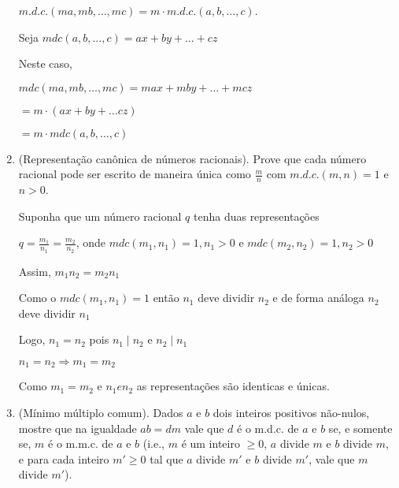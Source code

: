 \documentclass[a4paper,12pt]{article}
\begin{document}
\begin{enumerate}[label=3.\arabic*.]
    $m.d.c.(ma,mb,\ldots,mc) = m \cdot m.d.c.(a,b,\ldots,c)$.
    
    Seja $mdc(a,b,\ldots,c) = ax + by + \ldots + cz$
    
    Neste caso,

    $mdc(ma,mb,\ldots,mc) = max + mby + \ldots + mcz$
    
    $= m \cdot (ax + by + \ldots cz)$
    
    $= m \cdot mdc(a,b,\ldots,c)$      

    \item (Representação canônica de números racionais). Prove que cada número racional 
    pode ser escrito de maneira única como $\frac{m}{n}$ com $m.d.c.(m,n) = 1$ e $n>0$.

    Suponha que um número racional $q$ tenha duas representações

    $q = \frac{m_1}{n_1} = \frac{m_2}{n_2}$, onde $mdc(m_1,n_1) = 1, n_1 > 0$ e $mdc(m_2,n_2) = 1, n_2 > 0$

    Assim, $m_1n_2 = m_2n_1$

    Como o $mdc(m_1,n_1) = 1$ então $n_1$ deve dividir $n_2$ e de forma análoga $n_2$ deve dividir $n_1$

    Logo, $n_1 = n_2$ pois $n_1 \mid n_2$ e $n_2 \mid n_1$
    
    $n_1 = n_2 \Rightarrow m_1 = m_2$

    Como $m_1 = m_2$ e $n_1 e n_2$ as representações são identicas e únicas. 

    \item (Mínimo múltiplo comum). Dados $a$ e $b$ dois inteiros positivos não-nulos, mostre 
    que na igualdade $ab = d m$ vale que $d$ é o m.d.c. de $a$ e $b$ se, e somente se, $m$ é o 
    m.m.c. de $a$ e $b$ (i.e., $m$ é um inteiro $\geq 0$, $a$ divide $m$ e $b$ divide $m$, e para cada 
    inteiro $m' \geq 0$ tal que $a$ divide $m'$ e $b$ divide $m'$, vale que $m$ divide $m'$).

\end{enumerate}
\end{document}
